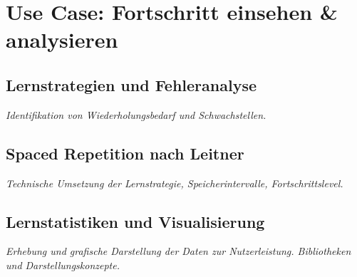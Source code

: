\section{Use Case: Fortschritt einsehen \& analysieren}

\subsection{Lernstrategien und Fehleranalyse}
\setauthor{\secondauthor}
\textit{Identifikation von Wiederholungsbedarf und Schwachstellen.}

\subsection{Spaced Repetition nach Leitner}
\setauthor{\secondauthor}
\textit{Technische Umsetzung der Lernstrategie, Speicherintervalle, Fortschrittslevel.}

\subsection{Lernstatistiken und Visualisierung}
\setauthor{\secondauthor}
\textit{Erhebung und grafische Darstellung der Daten zur Nutzerleistung. Bibliotheken und Darstellungskonzepte.}